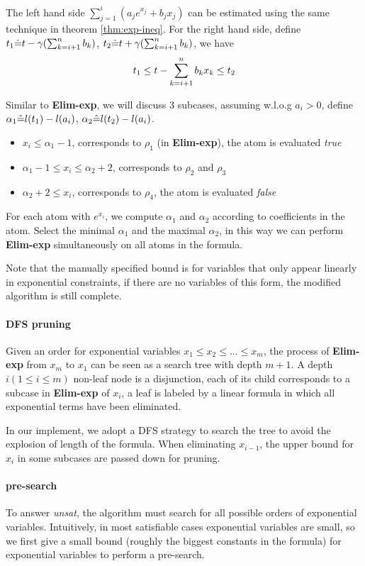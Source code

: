 {The left hand side $\sum_{j=1}^i (a_j e^{x_j} + b_j x_j)$ can be estimated using the same technique in theorem \ref{thm:exp-ineq}. For the right hand side, define  $ t_1 \hat{=} t-\gamma (\sum_{k=i+1}^n b_k)$, $t_2\hat{=} t+\gamma (\sum_{k=i+1}^n b_k)$, we have
\begin{equation}
    t_1  \le t - \sum_{k=i+1}^n b_k x_k \le  t_2 \notag
\end{equation} 

Similar to \textbf{Elim-exp}, we will discuss 3 subcases,
assuming w.l.o.g $a_i>0$, define $\alpha_1 \hat{=} l(t_1)-l(a_i)$, $\alpha_2 \hat{=} l(t_2)-l(a_i)$. 

\begin{itemize}
    \item $x_i\le \alpha_1 -1$, corresponds to $\rho_1$ (in \textbf{Elim-exp}), the atom is evaluated \textit{true}
    \item $\alpha_1 -1\le x_i \le \alpha_2 +2$, corresponds to $\rho_2$ and $\rho_3$
    \item $\alpha_2 + 2\le x_i$, corresponds to $\rho_4$, the atom is evaluated \textit{false}
\end{itemize}

For each atom with $e^{x_i}$, we compute $\alpha_1$ and $\alpha_2$ according to coefficients in the atom. Select the minimal $\alpha_1$ and the maximal $\alpha_2$, in this way we can perform \textbf{Elim-exp} simultaneously on all atoms in the formula.

Note that the manually specified bound is for variables that only appear linearly in exponential constraints, if there are no variables of this form, the modified algorithm is still complete.

\paragraph{DFS pruning}

Given an order for exponential variables $x_1\le x_2 \le ... \le x_m$, the process of \textbf{Elim-exp} from $x_m$ to $x_1$ can be seen as a search tree with depth $m+1$. A depth $i(1\le i\le m)$ non-leaf node is a disjunction, each of its child corresponds to a subcase in \textbf{Elim-exp} of $x_i$, a leaf is labeled by a linear formula in which all exponential terms have been eliminated.  

In our implement, we adopt a DFS strategy to search the tree to avoid the explosion of length of the formula. When eliminating $x_{i-1}$, the upper bound for $x_i$ in some subcases are passed down for pruning. 

\paragraph{pre-search}
To answer \textit{unsat}, the algorithm must search for all possible orders of exponential variables. Intuitively, in most satisfiable cases exponential variables are small, so we first give a small bound (roughly the biggest constants in the formula) for exponential variables to perform a pre-search.
}


